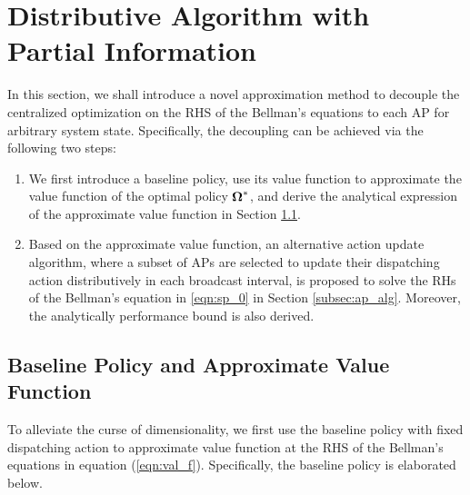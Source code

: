 \section{Distributive Algorithm with Partial Information}
\label{sec:algorithm}

In this section, we shall introduce a novel approximation method to decouple the centralized optimization on the RHS of the Bellman's equations to each AP for arbitrary system state.
Specifically, the decoupling can be achieved via the following two steps:
\begin{enumerate}
    \item We first introduce a baseline policy, use its value function to approximate the value function of the optimal policy $\boldsymbol{\Omega}^*$, and derive the analytical expression of the approximate value function in Section \ref{subsec:baseline}.
    \item Based on the approximate value function, an alternative action update algorithm, where a subset of APs are selected to update their dispatching action distributively in each broadcast interval, is proposed to solve the RHs of the Bellman's equation in \ref{eqn:sp_0} in Section \ref{subsec:ap_alg}.
    Moreover, the analytically performance bound is also derived.
\end{enumerate}

\subsection{Baseline Policy and Approximate Value Function}
\label{subsec:baseline}
To alleviate the curse of dimensionality, we first use the baseline policy with fixed dispatching action to approximate value function at the RHS of the Bellman's equations in equation (\ref{eqn:val_f}).
Specifically, the baseline policy is elaborated below.

